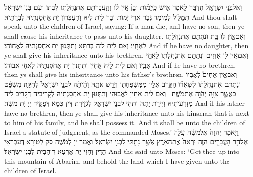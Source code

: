 {וְאֶל\maqqaf בְּנֵ֥י יִשְׂרָאֵ֖ל תְּדַבֵּ֣ר לֵאמֹ֑ר אִ֣ישׁ כִּֽי\maqqaf יָמ֗וּת וּבֵן֙ אֵ֣ין ל֔וֹ וְהַֽעֲבַרְתֶּ֥ם אֶת\maqqaf נַחֲלָת֖וֹ לְבִתּֽוֹ׃}
{וְעִם בְּנֵי יִשְׂרָאֵל תְּמַלֵּיל לְמֵימַר גְּבַר אֲרֵי יְמוּת וּבַר לֵית לֵיהּ וְתַעְבְּרוּן יָת אַחְסָנְתֵיהּ לִבְרַתֵּיהּ׃}
{And thou shalt speak unto the children of Israel, saying: If a man die, and have no son, then ye shall cause his inheritance to pass unto his daughter.}{}
{וְאִם\maqqaf אֵ֥ין ל֖וֹ בַּ֑ת וּנְתַתֶּ֥ם אֶת\maqqaf נַחֲלָת֖וֹ לְאֶחָֽיו׃}
{וְאִם לֵית לֵיהּ בְּרַתָּא וְתִתְּנוּן יָת אַחְסָנְתֵיהּ לַאֲחוֹהִי׃}
{And if he have no daughter, then ye shall give his inheritance unto his brethren.}{}
{וְאִם\maqqaf אֵ֥ין ל֖וֹ אַחִ֑ים וּנְתַתֶּ֥ם אֶת\maqqaf נַחֲלָת֖וֹ לַאֲחֵ֥י אָבִֽיו׃}
{וְאִם לֵית לֵיהּ אַחִין וְתִתְּנוּן יָת אַחְסָנְתֵיהּ לַאֲחֵי אֲבוּהִי׃}
{And if he have no brethren, then ye shall give his inheritance unto his father’s brethren.}{}
{וְאִם\maqqaf אֵ֣ין אַחִים֮ לְאָבִיו֒ וּנְתַתֶּ֣ם אֶת\maqqaf נַחֲלָת֗וֹ לִשְׁאֵר֞וֹ הַקָּרֹ֥ב אֵלָ֛יו מִמִּשְׁפַּחְתּ֖וֹ וְיָרַ֣שׁ אֹתָ֑הּ וְֽהָ֨יְתָ֜ה לִבְנֵ֤י יִשְׂרָאֵל֙ לְחֻקַּ֣ת מִשְׁפָּ֔ט כַּאֲשֶׁ֛ר צִוָּ֥ה יְהֹוָ֖ה אֶת\maqqaf מֹשֶֽׁה׃ \petucha }
{וְאִם לֵית אַחִין לַאֲבוּהִי וְתִתְּנוּן יָת אַחְסָנְתֵיהּ לְקָרִיבֵיהּ דְּקָרִיב לֵיהּ מִזַּרְעִיתֵיהּ וְיֵירַת יָתַהּ וּתְהֵי לִבְנֵי יִשְׂרָאֵל לִגְזֵירַת דִּין כְּמָא דְּפַקֵּיד יְיָ יָת מֹשֶׁה׃}
{And if his father have no brethren, then ye shall give his inheritance unto his kinsman that is next to him of his family, and he shall possess it. And it shall be unto the children of Israel a statute of judgment, as the \lord\space commanded Moses.’}{}
{וַיֹּ֤אמֶר יְהֹוָה֙ אֶל\maqqaf מֹשֶׁ֔ה עֲלֵ֛ה אֶל\maqqaf הַ֥ר הָעֲבָרִ֖ים הַזֶּ֑ה וּרְאֵה֙ אֶת\maqqaf הָאָ֔רֶץ אֲשֶׁ֥ר נָתַ֖תִּי לִבְנֵ֥י יִשְׂרָאֵֽל׃}
{וַאֲמַר יְיָ לְמֹשֶׁה סַק לְטוּרָא דְּעִבְרָאֵי הָדֵין וַחְזִי יָת אַרְעָא דִּיהַבִית לִבְנֵי יִשְׂרָאֵל׃}
{And the \lord\space said unto Moses: ‘Get thee up into this mountain of Abarim, and behold the land which I have given unto the children of Israel.}{}
